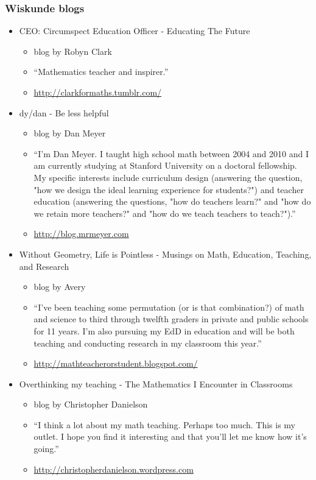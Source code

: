 \subsubsection{Wiskunde blogs}
\begin{itemize}

\item CEO: Circumspect Education Officer - Educating The Future
\begin{itemize} [noitemsep]
 \item blog by Robyn Clark
\item “Mathematics teacher and inspirer.”
\item \underline{http://clarkformaths.tumblr.com/ }
\end{itemize}

\item dy/dan - Be less helpful
\begin{itemize} [noitemsep]
\item blog by Dan Meyer
\item “I'm Dan Meyer. I taught high school math between 2004 and 2010 and I am currently studying at Stanford University on a doctoral fellowship. My specific interests include curriculum design (answering the question, "how we design the ideal learning experience for students?") and teacher education (answering the questions, "how do teachers learn?" and "how do we retain more teachers?" and "how do we teach teachers to teach?").”
\item \underline{http://blog.mrmeyer.com }
\end{itemize}

\item Without Geometry, Life is Pointless - Musings on Math, Education, Teaching, and Research

\begin{itemize}[noitemsep]
 \item blog by Avery
\item “I've been teaching some permutation (or is that combination?) of math and science to third through twelfth graders in private and public schools for 11 years. I'm also pursuing my EdD in education and will be both teaching and conducting research in my classroom this year.”
\item \underline{ http://mathteacherorstudent.blogspot.com/ }
\end{itemize}

\item Overthinking my teaching - The Mathematics I Encounter in Classrooms
\begin{itemize}[noitemsep]
\item blog by Christopher Danielson
\item “I think a lot about my math teaching. Perhaps too much. This is my outlet. I hope you find it interesting and that you’ll let me know how it’s going.”
\item \underline{http://christopherdanielson.wordpress.com}
\end{itemize}


\end{itemize}
